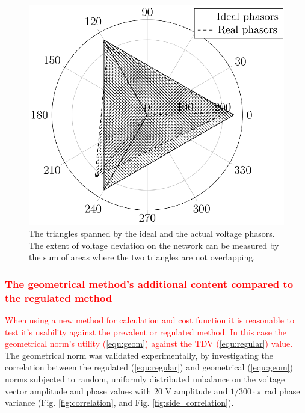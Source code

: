             \begin{figure}[!ht]
           \centering
           \includegraphics[scale=0.95]{Unblance_EPS_Pics/UnbalRedComp_JCP-figure1.eps}
           \caption{The triangles spanned by the ideal and the actual voltage phasors. The extent of voltage deviation on the network can be measured by the sum of areas where the two triangles are not overlapping.}
           \label{fig:threephase}
            \end{figure}

            \subsubsection{\textcolor{red}{The geometrical method's additional content compared to the regulated method}}

            \textcolor{red}{When using a new method for calculation and cost function it is reasonable to test it's usability against the prevalent or regulated method. In this case the geometrical norm's utility (\ref{equ:geom}) against the TDV (\ref{equ:regular}) value. }
            The geometrical norm was validated experimentally, by investigating the correlation between the regulated (\ref{equ:regular})  and geometrical (\ref{equ:geom}) norms subjected to random, uniformly distributed unbalance on the voltage vector amplitude and phase values with $20$ V amplitude and $1/300\cdot\pi$ rad phase variance (Fig. \ref{fig:correlation}, and Fig. \ref{fig:side_correlation}).

